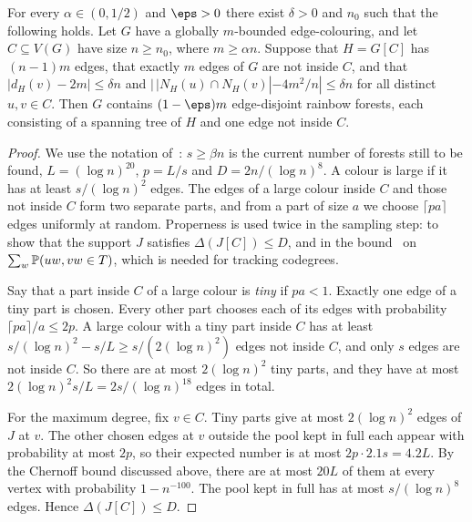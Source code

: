 \begin{lemma}\label{lem:xu51}
For every $\alpha\in(0,1/2)$ and $\eps>0$ there exist $\delta>0$ and $n_0$ such that the following holds.
Let $G$ have a globally $m$-bounded edge-colouring, and let $C\subseteq V(G)$ have size $n\ge n_0$, where $m\ge\alpha n$.
Suppose that $H=G[C]$ has $(n-1)m$ edges, that exactly $m$ edges of $G$ are not inside $C$, and that $|d_H(v)-2m|\le\delta n$ and $|\,|N_H(u)\cap N_H(v)|-4m^2/n|\le\delta n$ for all distinct $u,v\in C$.
Then $G$ contains $(1-\eps)m$ edge-disjoint rainbow forests, each consisting of a spanning tree of $H$ and one edge not inside $C$.
\end{lemma}
\begin{proof}
We use the notation of~\cite[Section~5]{Xu}: $s\ge\beta n$ is the current number of forests still to be found, $L=(\log n)^{20}$, $p=L/s$ and $D=2n/(\log n)^8$. A colour is large if it has at least $s/(\log n)^2$ edges. The edges of a large colour inside $C$ and those not inside $C$ form two separate parts, and from a part of size $a$ we choose $\lceil pa\rceil$ edges uniformly at random.
Properness is used twice in the sampling step: to show that the support $J$ satisfies $\Delta(J[C])\le D$, and in the bound~\cite[(5.3)]{Xu} on $\sum_w\mathbb{P}(uw,vw\in T)$, which is needed for tracking codegrees.

Say that a part inside $C$ of a large colour is \emph{tiny} if $pa<1$. Exactly one edge of a tiny part is chosen. Every other part chooses each of its edges with probability $\lceil pa\rceil/a\le2p$.
A large colour with a tiny part inside $C$ has at least $s/(\log n)^2-s/L\ge s/(2(\log n)^2)$ edges not inside $C$, and only $s$ edges are not inside $C$. So there are at most $2(\log n)^2$ tiny parts, and they have at most $2(\log n)^2s/L=2s/(\log n)^{18}$ edges in total.

For the maximum degree, fix $v\in C$. Tiny parts give at most $2(\log n)^2$ edges of $J$ at $v$. The other chosen edges at $v$ outside the pool kept in full each appear with probability at most $2p$, so their expected number is at most $2p\cdot2.1s=4.2L$. By the Chernoff bound discussed above, there are at most $20L$ of them at every vertex with probability $1-n^{-100}$. The pool kept in full has at most $s/(\log n)^8$ edges. Hence $\Delta(J[C])\le D$.


\end{proof}
